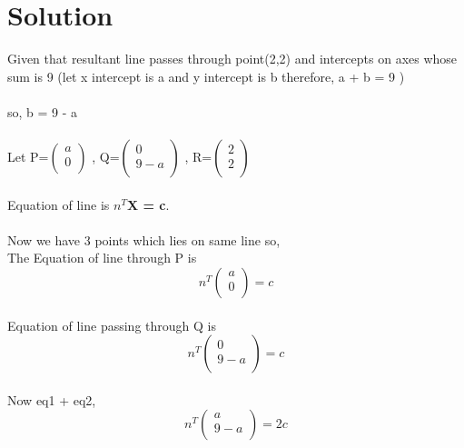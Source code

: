 \documentclass[journal,12pt,twocolumn]{IEEEtran}
\begin{document}
\section{Solution}
Given that resultant line passes through point(2,2) and intercepts on axes whose sum is 9 (let x intercept is a and y intercept is b therefore, a + b = 9 ) \\
\\
so, b = 9 - a  \\
\\
Let P=$\begin{pmatrix}
  a\\
  0\\
 \end{pmatrix}$%
 , Q=$\begin{pmatrix}
  0\\
  9-a\\
 \end{pmatrix}$%
 , R=$\begin{pmatrix}
  2\\
  2\\
 \end{pmatrix}$%
\\
\\
Equation of line is \textbf{$n^{T}$X = c}.\\
\\
Now we have 3 points which lies on same line so,\\
 The Equation of line through P is\\
\begin{equation}
n^T
     \begin{pmatrix}
  a\\
  0\\
 \end{pmatrix}%
  = c \label{eq-1}
\end{equation}
\\
Equation of line passing through Q is\\
\begin{equation}
n^T
     \begin{pmatrix}
  0\\
  9 - a\\
 \end{pmatrix}%
  = c \label{eq-2}
\end{equation}
\\
Now eq1 + eq2,\\
\begin{equation}
n^T
     \begin{pmatrix}
  a\\
  9 - a\\
 \end{pmatrix}%
  = 2c \label{eq-3}
\end{equation}
\end{document}
